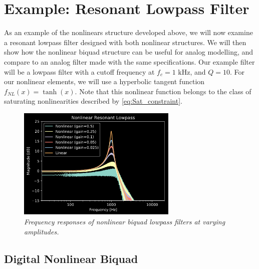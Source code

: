 \documentclass{IEEEtran}
\begin{document}
\section{Example: Resonant Lowpass Filter}
%
As an example of the nonlinears structure developed above,
we will now examine a resonant lowpass filter
designed with both nonlinear structures. We will then show how the
nonlinear biquad structure can be useful for analog modelling,
and compare to an analog filter made with the same specifications.
\newline\newline
Our example filter will be a lowpass filter with a cutoff frequency
at $f_c = 1\text{ kHz}$, and $Q=10$. For our nonlinear elements, we
will use a hyperbolic tangent function $f_{NL}(x) = \tanh (x)$.
Note that this nonlinear function belongs to the class of
saturating nonlinearities described by \cref{eq:Sat_constraint}.
%
\begin{figure}[h]
    \center
    \includegraphics[width=3in]{../Pics/NL-LPF.png}
    \caption{\label{NL-LPF-freq}{\it Frequency responses of nonlinear biquad lowpass
                                    filters at varying amplitudes.}}
\end{figure}
%

\subsection{Digital Nonlinear Biquad}
\end{document}
